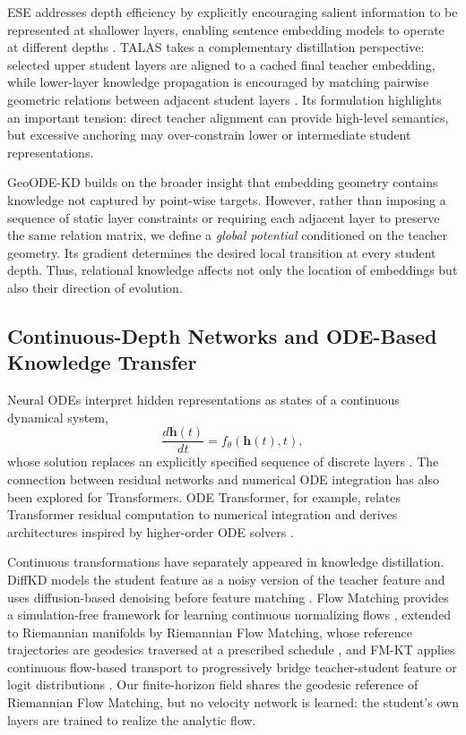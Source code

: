 \documentclass[11pt]{article}
\begin{document}
ESE addresses depth efficiency by explicitly encouraging salient
information to be represented at shallower layers, enabling sentence
embedding models to operate at different depths \citep{li2025ese}.
TALAS takes a complementary distillation perspective: selected upper
student layers are aligned to a cached final teacher embedding, while
lower-layer knowledge propagation is encouraged by matching pairwise
geometric relations between adjacent student layers \citep{talas}.
Its formulation highlights an important tension: direct teacher alignment
can provide high-level semantics, but excessive anchoring may over-constrain
lower or intermediate student representations.

GeoODE-KD builds on the broader insight that embedding geometry contains
knowledge not captured by point-wise targets. However, rather than imposing
a sequence of static layer constraints or requiring each adjacent layer to
preserve the same relation matrix, we define a \emph{global potential}
conditioned on the teacher geometry. Its gradient determines the desired
local transition at every student depth. Thus, relational knowledge affects
not only the location of embeddings but also their direction of evolution.

\subsection{Continuous-Depth Networks and ODE-Based Knowledge Transfer}

Neural ODEs interpret hidden representations as states of a continuous
dynamical system,
\begin{equation}
    \frac{d\mathbf{h}(t)}{dt}
    =
    f_\theta(\mathbf{h}(t),t),
\end{equation}
whose solution replaces an explicitly specified sequence of discrete
layers \citep{chen2018neuralode}. The connection between residual networks
and numerical ODE integration has also been explored for Transformers.
ODE Transformer, for example, relates Transformer residual computation to
numerical integration and derives architectures inspired by higher-order
ODE solvers \citep{li2022odetransformer}.

Continuous transformations have separately appeared in knowledge
distillation. DiffKD models the student feature as a noisy version of the
teacher feature and uses diffusion-based denoising before feature matching
\citep{huang2023diffkd}. Flow Matching provides a simulation-free framework
for learning continuous normalizing flows \citep{lipman2023flow}, extended
to Riemannian manifolds by Riemannian Flow Matching, whose reference
trajectories are geodesics traversed at a prescribed schedule
\citep{chen2024riemannian}, and FM-KT applies continuous flow-based
transport to progressively bridge teacher-student feature or logit
distributions \citep{shao2024fmkt}. Our finite-horizon field shares the
geodesic reference of Riemannian Flow Matching, but no velocity network is
learned: the student's own layers are trained to realize the analytic flow.
\end{document}
